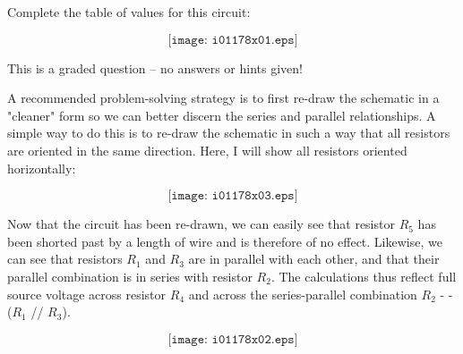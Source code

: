 

Complete the table of values for this circuit:

$$\texttt{[image: i01178x01.eps]}$$

\vfil 

\eject






This is a graded question -- no answers or hints given!







A recommended problem-solving strategy is to first re-draw the schematic in a "cleaner" form so we can better discern the series and parallel relationships.  A simple way to do this is to re-draw the schematic in such a way that all resistors are oriented in the same direction.  Here, I will show all resistors oriented horizontally:

$$\texttt{[image: i01178x03.eps]}$$

Now that the circuit has been re-drawn, we can easily see that resistor $R_5$ has been shorted past by a length of wire and is therefore of no effect.  Likewise, we can see that resistors $R_1$ and $R_3$ are in parallel with each other, and that their parallel combination is in series with resistor $R_2$.  The calculations thus reflect full source voltage across resistor $R_4$ and across the series-parallel combination $R_2$ - - ($R_1$ // $R_3$).

$$\texttt{[image: i01178x02.eps]}$$



